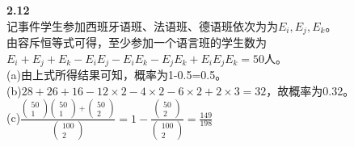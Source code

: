 \documentclass{book}%
\begin{document}
	{\bfseries 2.12}\\
	记事件学生参加西班牙语班、法语班、德语班依次为为$E_{i},E_{j},E_{k}$。\\
	由容斥恒等式可得，至少参加一个语言班的学生数为$E_{i}+E_{j}+E_{k}-E_{i}E_{j}-E_{i}E_{k}-E_{j}E_{k}+E_{i}E_{j}E_{k}=50$人。\\
	(a)由上式所得结果可知，概率为1-0.5=0.5。\\
	(b)$28+26+16-12\times 2-4\times 2-6\times 2+2\times 3=32$，故概率为0.32。\\
	(c)$\frac{\begin{pmatrix}
			50\\1
		\end{pmatrix}\begin{pmatrix}
			50\\1
		\end{pmatrix}+\begin{pmatrix}
			50\\2
	\end{pmatrix}}{\begin{pmatrix}
			100\\2
	\end{pmatrix}}=1-\frac{\begin{pmatrix}
	50\\2
	\end{pmatrix}}{\begin{pmatrix}
	100\\2
	\end{pmatrix}}=\frac{149}{198}$\\
	~\\
	
\end{document}
